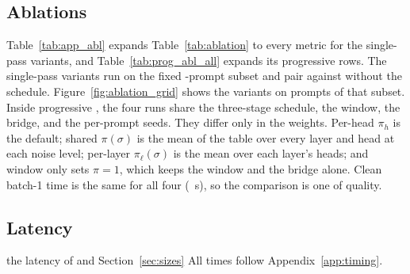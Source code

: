 \ifshortversion\else
{}
\fi

\ifshortversion\else
\fullonly{\FloatBarrier}
\subsection{Ablations}
\label{app:abl}

Table~\ref{tab:app_abl} expands Table~\ref{tab:ablation} to every metric for the single-pass variants\ifresprogabl, and Table~\ref{tab:prog_abl_all} expands its progressive rows\fi. The single-pass variants run on the fixed \nabl-prompt subset and pair against \sca{} without the schedule. Figure~\ref{fig:ablation_grid} shows the variants on prompts of that subset.\ifresprogabl{} Inside progressive \sca{}, the four runs share the three-stage schedule, the window, the bridge, and the per-prompt seeds. They differ only in the weights. Per-head $\pi_h$ is the default; shared $\pi(\sigma)$ is the mean of the table over every layer and head at each noise level; per-layer $\pi_\ell(\sigma)$ is the mean over each layer's heads; and window only sets $\pi=1$, which keeps the window and the bridge alone. Clean batch-1 time is the same for all four (\progAblSeconds~s), so the comparison is one of quality.\fi


\ifresprogabl
{}
\fi
{}

\fi
\fullonly{\FloatBarrier}
\subsection{Latency}
\label{app:latency}

 the latency of  and Section~\ref{sec:sizes} All times follow Appendix~\ref{app:timing}.

